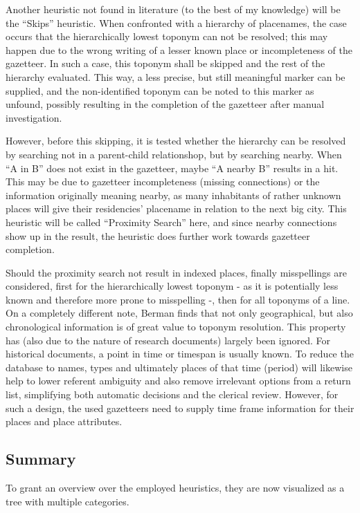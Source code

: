 \documentclass[11pt]{article}
\begin{document}
Another heuristic not found in literature (to the best of my knowledge) will be the ``Skips'' heuristic. When confronted with a hierarchy of placenames, the case occurs that the hierarchically lowest toponym can not be resolved; this may happen due to the wrong writing of a lesser known place or incompleteness of the gazetteer. In such a case, this toponym shall be skipped and the rest of the hierarchy evaluated. This way, a less precise, but still meaningful marker can be supplied, and the non-identified toponym can be noted to this marker as unfound, possibly resulting in the completion of the gazetteer after manual investigation.

However, before this skipping, it is tested whether the hierarchy can be resolved by searching not in a parent-child relationshop, but by searching nearby. When ``A in B'' does not exist in the gazetteer, maybe ``A nearby B'' results in a hit. This may be due to gazetteer incompleteness (missing connections) or the information originally meaning nearby, as many inhabitants of rather unknown places will give their residencies' placename in relation to the next big city. This heuristic will be called ``Proximity Search'' here, and since nearby connections show up in the result, the heuristic does further work towards gazetteer completion.

Should the proximity search not result in indexed places, finally misspellings are considered, first for the hierarchically lowest toponym - as it is potentially less known and therefore more prone to misspelling -, then for all toponyms of a line.\\

On a completely different note, Berman finds that not only geographical, but also chronological information is of great value to toponym resolution. \cite{berman08} This property has (also due to the nature of research documents) largely been ignored. For historical documents, a point in time or timespan is usually known. To reduce the database to names, types and ultimately places of that time (period) will likewise help to lower referent ambiguity and also remove irrelevant options from a return list, simplifying both automatic decisions and the clerical review. However, for such a design, the used gazetteers need to supply time frame information for their places and place attributes.

\subsection{Summary}
To grant an overview over the employed heuristics, they are now visualized as a tree with multiple categories.
\end{document}
